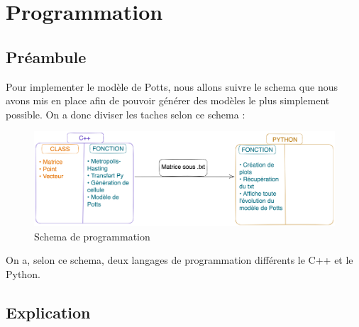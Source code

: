 

\chapter{Programmation}
\setcounter{chapter}{1}

\begin{article}
    \section{Préambule}\label{sec:preambule}%
    Pour implementer le modèle de Potts, nous allons suivre le schema que nous avons mis en place afin de pouvoir générer des modèles le plus simplement possible.
    \newline On a donc diviser les taches selon ce schema :
    \newline
    \begin{figure}[ht]
        \centering
        \includegraphics[scale=0.09]{./img/prog/Schema_prog}
        \caption{Schema de programmation}
        \label{fig1}
    \end{figure}

    On a, selon ce schema, deux langages de programmation différents le C++ et le Python.

    \section{Explication}\label{sec:explication}

\end{article}
